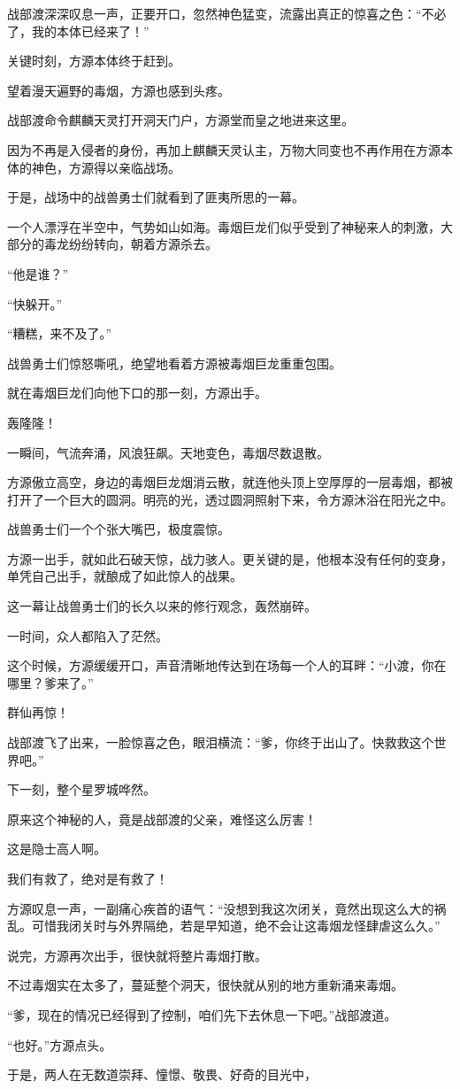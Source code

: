 \begin{this_body}
战部渡深深叹息一声，正要开口，忽然神色猛变，流露出真正的惊喜之色：“不必了，我的本体已经来了！”

关键时刻，方源本体终于赶到。

望着漫天遍野的毒烟，方源也感到头疼。

战部渡命令麒麟天灵打开洞天门户，方源堂而皇之地进来这里。

因为不再是入侵者的身份，再加上麒麟天灵认主，万物大同变也不再作用在方源本体的神色，方源得以亲临战场。

于是，战场中的战兽勇士们就看到了匪夷所思的一幕。

一个人漂浮在半空中，气势如山如海。毒烟巨龙们似乎受到了神秘来人的刺激，大部分的毒龙纷纷转向，朝着方源杀去。

“他是谁？”

“快躲开。”

“糟糕，来不及了。”

战兽勇士们惊怒嘶吼，绝望地看着方源被毒烟巨龙重重包围。

就在毒烟巨龙们向他下口的那一刻，方源出手。

轰隆隆！

一瞬间，气流奔涌，风浪狂飙。天地变色，毒烟尽数退散。

方源傲立高空，身边的毒烟巨龙烟消云散，就连他头顶上空厚厚的一层毒烟，都被打开了一个巨大的圆洞。明亮的光，透过圆洞照射下来，令方源沐浴在阳光之中。

战兽勇士们一个个张大嘴巴，极度震惊。

方源一出手，就如此石破天惊，战力骇人。更关键的是，他根本没有任何的变身，单凭自己出手，就酿成了如此惊人的战果。

这一幕让战兽勇士们的长久以来的修行观念，轰然崩碎。

一时间，众人都陷入了茫然。

这个时候，方源缓缓开口，声音清晰地传达到在场每一个人的耳畔：“小渡，你在哪里？爹来了。”

群仙再惊！

战部渡飞了出来，一脸惊喜之色，眼泪横流：“爹，你终于出山了。快救救这个世界吧。”

下一刻，整个星罗城哗然。

原来这个神秘的人，竟是战部渡的父亲，难怪这么厉害！

这是隐士高人啊。

我们有救了，绝对是有救了！

方源叹息一声，一副痛心疾首的语气：“没想到我这次闭关，竟然出现这么大的祸乱。可惜我闭关时与外界隔绝，若是早知道，绝不会让这毒烟龙怪肆虐这么久。”

说完，方源再次出手，很快就将整片毒烟打散。

不过毒烟实在太多了，蔓延整个洞天，很快就从别的地方重新涌来毒烟。

“爹，现在的情况已经得到了控制，咱们先下去休息一下吧。”战部渡道。

“也好。”方源点头。

于是，两人在无数道崇拜、憧憬、敬畏、好奇的目光中，

\end{this_body}

